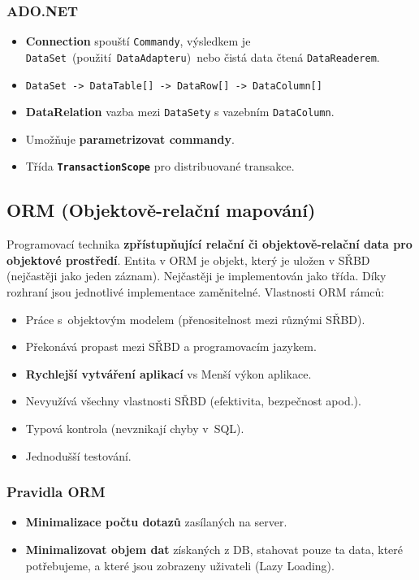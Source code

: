 \subsubsection{ADO.NET}
\begin{itemize}
\item \textbf{Connection} spouští \texttt{Commandy}, výsledkem je \texttt{DataSet} (použití \texttt{DataAdapteru}) nebo čistá data čtená \texttt{DataReaderem}.
\item \texttt{DataSet -> DataTable[] -> DataRow[] -> DataColumn[]}
\item \textbf{DataRelation} vazba mezi \texttt{DataSety} s vazebním \texttt{DataColumn}.
\item Umožňuje \textbf{parametrizovat commandy}.
\item Třída \textbf{\texttt{TransactionScope}} pro distribuované transakce.
\end{itemize}

\subsection{ORM (Objektově-relační mapování)}
Programovací technika \textbf{zpřístupňující relační či objektově-relační data pro objektové prostředí}. Entita v ORM je objekt, který je uložen v SŘBD (nejčastěji jako jeden záznam). Nejčastěji je implementován jako třída. Díky rozhraní jsou jednotlivé implementace zaměnitelné. Vlastnosti ORM rámců:
\begin{itemize} 
\item Práce s objektovým modelem (přenositelnost mezi různými SŘBD).
\item Překonává propast mezi SŘBD a programovacím jazykem.
\item \textbf{Rychlejší vytváření aplikací} vs Menší výkon aplikace.
\item Nevyužívá všechny vlastnosti SŘBD (efektivita, bezpečnost apod.).
\item Typová kontrola (nevznikají chyby v SQL).
\item Jednodušší testování.
\end{itemize}

\subsubsection{Pravidla ORM}
\begin{itemize}
\item \textbf{Minimalizace počtu dotazů }zasílaných na server.
\item \textbf{Minimalizovat objem dat} získaných z DB, stahovat pouze ta data, které potřebujeme, a které jsou zobrazeny uživateli (Lazy Loading).
\end{itemize}

